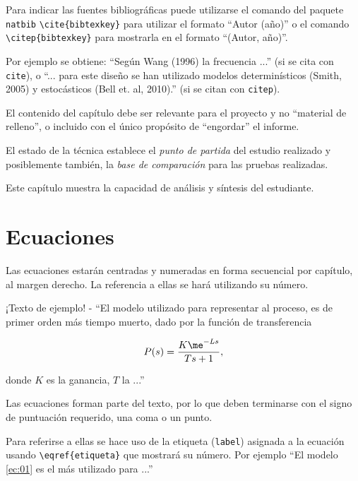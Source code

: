 Para indicar las fuentes bibliográficas puede utilizarse el comando del paquete \texttt{natbib} \texttt{\textbackslash cite\{bibtexkey\}} para utilizar el formato ``Autor (año)'' o el comando \texttt{\textbackslash citep\{bibtexkey\}} para mostrarla en el formato ``(Autor, año)''.

Por ejemplo se obtiene: ``Según Wang (1996) la frecuencia ...'' (si se cita con \texttt{cite}), o ``... para este diseño se han utilizado modelos determinísticos (Smith, 2005) y estocásticos (Bell et. al, 2010).''  (si se citan con \texttt{citep}).  

El contenido del capítulo debe ser relevante para el proyecto y no ``material de relleno'', o incluido con el único propósito de ``engordar'' el informe.

El estado de la técnica establece el \emph{punto de partida} del estudio realizado y posiblemente también, la \emph{base de comparación} para las pruebas realizadas.

Este capítulo muestra la capacidad de análisis y síntesis del estudiante.
 
\section{Ecuaciones}
Las ecuaciones estarán centradas y numeradas en forma secuencial por capítulo, al margen derecho.  La referencia a ellas se hará utilizando su número.

¡Texto de ejemplo! - ``El modelo utilizado para representar al proceso, es de primer orden más tiempo muerto, dado por la función de transferencia

\begin{equation}  %
	P(s) = \frac{K \me^{-Ls}}{Ts+1}, \label{ec:01}
\end{equation}

\noindent donde $K$ es la ganancia, $T$ la ...''  

Las ecuaciones forman parte del texto, por lo que deben terminarse con el signo de puntuación requerido, una coma o un punto.

Para referirse a ellas se hace uso de la etiqueta (\texttt{label}) asignada a la ecuación usando \texttt{\textbackslash eqref\{etiqueta\}} que mostrará su número.  Por ejemplo ``El modelo \eqref{ec:01} es el más utilizado para ...''

